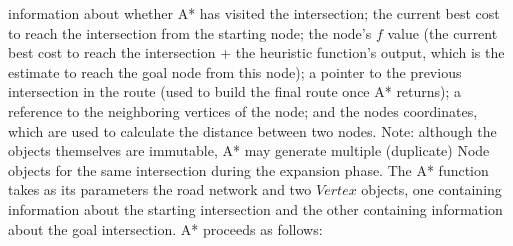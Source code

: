 \documentclass[conference]{IEEEtran}
\begin{document}
information about whether A* has visited the intersection; the current best cost to reach the intersection from the starting node; the node’s $f$ value (the current best cost to reach the intersection + the heuristic function's output, which is the estimate to reach the goal node from this node); a pointer to the previous intersection in the route (used to build the final route once A* returns); a reference to the neighboring vertices of the node; and the nodes coordinates, which are used to calculate the distance between two nodes.
\newline
\newline
Note: although the objects themselves are immutable, A* may generate multiple (duplicate) Node objects for the same intersection during the expansion phase.
\newline
\newline
The A* function takes as its parameters the road network and two $Vertex$ objects, one containing information about the starting intersection and the other containing information about the goal intersection.
\newline
\newline
A* proceeds as follows:
\end{document}
